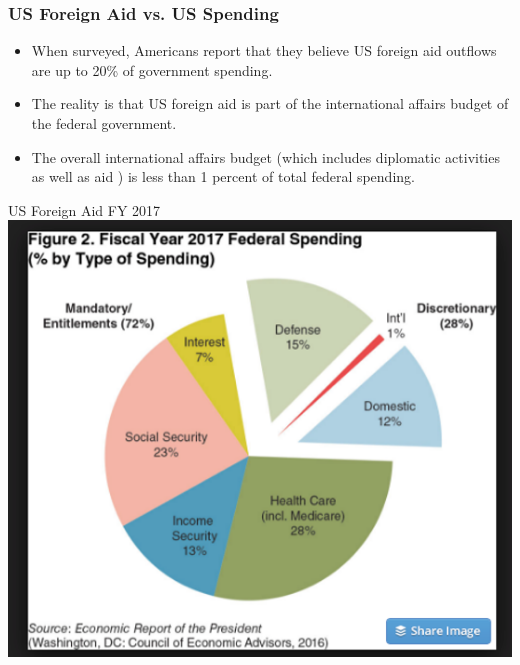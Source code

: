 \documentclass{beamer}
\begin{document}
\begin{frame} 
	\frametitle{\LARGE{US Foreign Aid vs. US Spending}}
	\begin{itemize}
		\item When surveyed, Americans report that they believe US foreign aid outflows are up to 20\% of government spending. \pause
		\item The reality is that US foreign aid is part of the international affairs budget of the federal government. \pause
		\item The overall international affairs budget (which includes diplomatic activities as well as aid ) is less than 1 percent of total federal spending.
	\end{itemize}
\end{frame}

\begin{frame}{\LARGE US Foreign Aid FY 2017}
	\centering
	\includegraphics[width=\textwidth,height=\textheight,keepaspectratio]{USfedbudget.png}
\end{frame}
\end{document}
